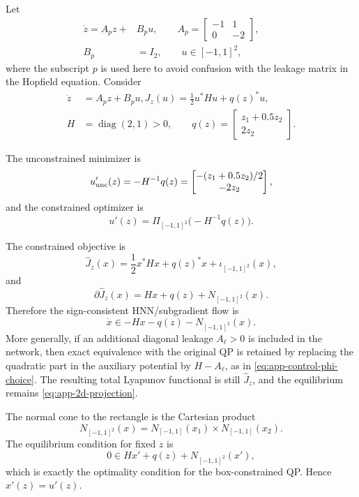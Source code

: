 \documentclass[journal]{IEEEtran}
\theoremstyle{myplain}
\begin{document}
Let
\begin{equation*}
  \begin{aligned}
  \dot z=A_pz+&B_pu,
  \qquad
  A_p=
  \begin{bmatrix}
    -1&1\\
    0&-2
  \end{bmatrix},
  \qquad \\
  B_p&=I_2,
  \qquad
  u\in[-1,1]^2,
  \end{aligned}
\end{equation*}
where the subscript \(p\) is used here to avoid confusion with the leakage
matrix in the Hopfield equation. Consider
\begin{equation*}
  \begin{aligned}
  \dot z&=A_pz+B_pu,
   J_z(u)=\frac12 u^*Hu+q(z)^*u,
  \qquad\\
  H&=\operatorname{diag}(2,1)>0,
  \qquad
  q(z)=
  \begin{bmatrix}
    z_1+0.5z_2\\
    2z_2
  \end{bmatrix}.
  \end{aligned}
\end{equation*}

The unconstrained minimizer is
\[
  u_{\rm unc}'(z)=-H^{-1}q(z)
  =
  \begin{bmatrix}
    -(z_1+0.5z_2)/2\\
    -2z_2
  \end{bmatrix},
\]
and the constrained optimizer is
\begin{equation}\label{eq:app-2d-projection}
  u'(z)=\Pi_{[-1,1]^2}\bigl(-H^{-1}q(z)\bigr).
\end{equation}

The constrained objective is
\[
  \widehat J_z(x)=\frac12 x^*Hx+q(z)^*x+\iota_{[-1,1]^2}(x),
\]
and
\[
  \partial\widehat J_z(x)=Hx+q(z)+N_{[-1,1]^2}(x).
\]
Therefore the sign-consistent HNN/subgradient flow is
\begin{equation}\label{eq:app-2d-hnn-correct}
  \dot x\in -Hx-q(z)-N_{[-1,1]^2}(x).
\end{equation}
More generally, if an additional diagonal leakage \(A_\ell>0\) is included in
the network, then exact equivalence with the original QP is retained by
replacing the quadratic part in the auxiliary potential by \(H-A_\ell\), as in
\eqref{eq:app-control-phi-choice}. The resulting total Lyapunov functional is
still \(\widehat J_z\), and the equilibrium remains \eqref{eq:app-2d-projection}.

The normal cone to the rectangle is the Cartesian product
\[
  N_{[-1,1]^2}(x)=N_{[-1,1]}(x_1)\times N_{[-1,1]}(x_2).
\]
The equilibrium condition for fixed \(z\) is
\[
  0\in Hx'+q(z)+N_{[-1,1]^2}(x'),
\]
which is exactly the optimality condition for the box-constrained QP. Hence
\(x'(z)=u'(z)\).
\end{document}
